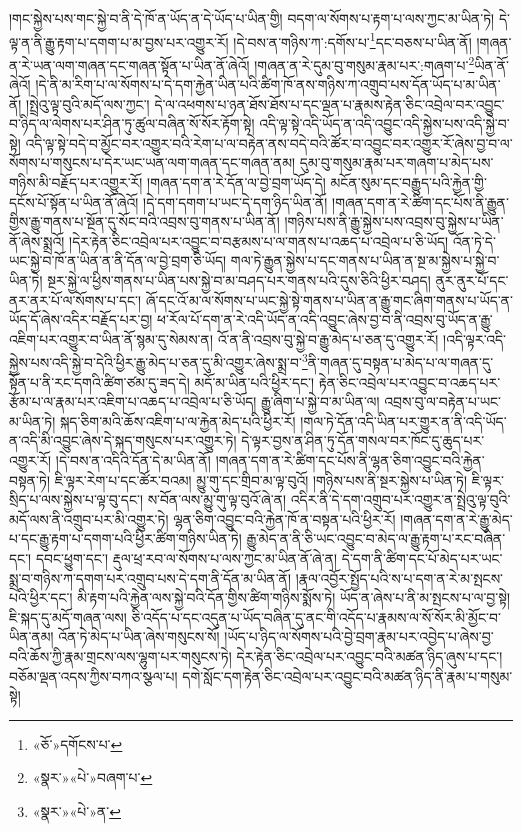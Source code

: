 །གང་སྐྱེས་པས་གང་སྐྱེ་བ་ནི་དེ་ཁོ་ན་ཡོད་ན་དེ་ཡོད་པ་ཡིན་གྱི། བདག་ལ་སོགས་པ་རྟག་པ་ལས་ཀྱང་མ་ཡིན་ཏེ། དེ་ལྟ་ན་ནི་རྒྱུ་རྟག་པ་དགག་པ་མ་བྱས་པར་འགྱུར་རོ། །དེ་བས་ན་གཉིས་ཀ་:དགོས་པ་\footnote{«ཅོ་»དགོངས་པ་}དང་བཅས་པ་ཡིན་ནོ། །གཞན་ན་རེ་ཡན་ལག་གཞན་དང་གཞན་སྟོན་པ་ཡིན་ནོ་ཞེའོ། །གཞན་ན་རེ་དུམ་བུ་གསུམ་རྣམ་པར་:གཞག་པ་\footnote{«སྣར་»«པེ་»བཞག་པ་}ཡིན་ནོ་ཞེའོ། །དེ་ནི་མ་རིག་པ་ལ་སོགས་པ་དེ་དག་རྐྱེན་ཡིན་པའི་ཚིག་ཁོ་ནས་གཉིས་ཀ་འགྲུབ་པས་དོན་ཡོད་པ་མ་ཡིན་ནོ། །སྤྲེའུ་ལྟ་བུའི་མདོ་ལས་ཀྱང་། དེ་ལ་འཕགས་པ་ཉན་ཐོས་ཐོས་པ་དང་ལྡན་པ་རྣམས་རྟེན་ཅིང་འབྲེལ་བར་འབྱུང་བ་ཉིད་ལ་ལེགས་པར་ཤིན་ཏུ་ཚུལ་བཞིན་སོ་སོར་རྟོག་སྟེ། འདི་ལྟ་སྟེ་འདི་ཡོད་ན་འདི་འབྱུང་འདི་སྐྱེས་པས་འདི་སྐྱེ་བ་སྟེ། འདི་ལྟ་སྟེ་བདེ་བ་མྱོང་བར་འགྱུར་བའི་རེག་པ་ལ་བརྟེན་ནས་བདེ་བའི་ཚོར་བ་འབྱུང་བར་འགྱུར་རོ་ཞེས་བྱ་བ་ལ་སོགས་པ་གསུངས་པ་དེར་ཡང་ཡན་ལག་གཞན་དང་གཞན་ནམ། དུམ་བུ་གསུམ་རྣམ་པར་གཞག་པ་མེད་པས་གཉིས་མི་བརྗོད་པར་འགྱུར་རོ། །གཞན་དག་ན་རེ་དོན་ལ་བྱེ་བྲག་ཡོད་དེ། མངོན་སུམ་དང་བརྒྱུད་པའི་རྐྱེན་གྱི་དངོས་པོ་སྟོན་པ་ཡིན་ནོ་ཞེའོ། །དེ་དག་དགག་པ་ཡང་དེ་དག་ཉིད་ཡིན་ནོ། །གཞན་དག་ན་རེ་ཚིག་དང་པོས་ནི་རྒྱུན་གྱིས་རྒྱུ་གནས་པ་སྔོན་དུ་སོང་བའི་འབྲས་བུ་གནས་པ་ཡིན་ནོ། །གཉིས་པས་ནི་རྒྱུ་སྐྱེས་པས་འབྲས་བུ་སྐྱེས་པ་ཡིན་ནོ་ཞེས་སྨྲའོ། །དེར་རྟེན་ཅིང་འབྲེལ་པར་འབྱུང་བ་བརྩམས་པ་ལ་གནས་པ་འཆད་པ་འབྲེལ་པ་ཅི་ཡོད། འོན་ཏེ་དེ་ཡང་སྐྱེ་བ་ཁོ་ན་ཡིན་ན་ནི་དོན་ལ་བྱེ་བྲག་ཅི་ཡོད། གལ་ཏེ་རྒྱུན་སྐྱེས་པ་དང་གནས་པ་ཡིན་ན་སྔ་མ་སྐྱེས་པ་སྐྱེ་བ་ཡིན་ཏེ། སྔར་སྐྱེ་ལ་ཕྱིས་གནས་པ་ཡིན་པས་སྐྱེ་བ་མ་བཤད་པར་གནས་པའི་དུས་ཅིའི་ཕྱིར་བཤད། ནུར་ནུར་པོ་དང་ནར་ནར་པོ་ལ་སོགས་པ་དང་། ཞོ་དང་འོ་མ་ལ་སོགས་པ་ཡང་སྐྱེ་སྟེ་གནས་པ་ཡིན་ན་རྒྱུ་གང་ཞིག་གནས་པ་ཡོད་ན་ཡོད་དོ་ཞེས་འདིར་བརྗོད་པར་བྱ། ཕ་རོལ་པོ་དག་ན་རེ་འདི་ཡོད་ན་འདི་འབྱུང་ཞེས་བྱ་བ་ནི་འབྲས་བུ་ཡོད་ན་རྒྱུ་འཇིག་པར་འགྱུར་བ་ཡིན་ནོ་སྙམ་དུ་སེམས་ན། འོ་ན་ནི་འབྲས་བུ་སྐྱེ་བ་རྒྱུ་མེད་པ་ཅན་དུ་འགྱུར་རོ། །འདི་ལྟར་འདི་སྐྱེས་པས་འདི་སྐྱེ་བ་དེའི་ཕྱིར་རྒྱུ་མེད་པ་ཅན་དུ་མི་འགྱུར་ཞེས་སྨྲ་བ་\footnote{«སྣར་»«པེ་»ན་}ནི་གཞན་དུ་བསྟན་པ་མེད་པ་ལ་གཞན་དུ་སྟོན་པ་ནི་རང་དགའི་ཚིག་ཙམ་དུ་ཟད་དེ། མདོ་མ་ཡིན་པའི་ཕྱིར་དང་། རྟེན་ཅིང་འབྲེལ་པར་འབྱུང་བ་འཆད་པར་རྩོམ་པ་ལ་རྣམ་པར་འཇིག་པ་འཆད་པ་འབྲེལ་པ་ཅི་ཡོད། རྒྱུ་ཞིག་པ་སྐྱེ་བ་མ་ཡིན་ལ། འབྲས་བུ་ལ་བརྟེན་པ་ཡང་མ་ཡིན་ཏེ། སྐད་ཅིག་མའི་ཆོས་འཇིག་པ་ལ་རྐྱེན་མེད་པའི་ཕྱིར་རོ། །གལ་ཏེ་དོན་འདི་ཡིན་པར་གྱུར་ན་ནི་འདི་ཡོད་ན་འདི་མི་འབྱུང་ཞེས་དེ་སྐད་གསུངས་པར་འགྱུར་ཏེ། དེ་ལྟར་བྱས་ན་ཤིན་ཏུ་དོན་གསལ་བར་ཁོང་དུ་ཆུད་པར་འགྱུར་རོ། །དེ་བས་ན་འདིའི་དོན་དེ་མ་ཡིན་ནོ། །གཞན་དག་ན་རེ་ཚིག་དང་པོས་ནི་ལྷན་ཅིག་འབྱུང་བའི་རྐྱེན་བསྟན་ཏེ། ཇི་ལྟར་རེག་པ་དང་ཚོར་བའམ། མྱུ་གུ་དང་གྲིབ་མ་ལྟ་བུའོ། །གཉིས་པས་ནི་སྔར་སྐྱེས་པ་ཡིན་ཏེ། ཇི་ལྟར་སྲིད་པ་ལས་སྐྱེས་པ་ལྟ་བུ་དང་། ས་བོན་ལས་མྱུ་གུ་ལྟ་བུའོ་ཞེ་ན། འདིར་ནི་དེ་དག་འགྲུབ་པར་འགྱུར་ན་སྤྲེའུ་ལྟ་བུའི་མདོ་ལས་ནི་འགྲུབ་པར་མི་འགྱུར་ཏེ། ལྷན་ཅིག་འབྱུང་བའི་རྐྱེན་ཁོ་ན་བསྟན་པའི་ཕྱིར་རོ། །གཞན་དག་ན་རེ་རྒྱུ་མེད་པ་དང་རྒྱུ་རྟག་པ་དགག་པའི་ཕྱིར་ཚིག་གཉིས་ཡིན་ཏེ། རྒྱུ་མེད་ན་ནི་ཅི་ཡང་འབྱུང་བ་མེད་ལ་རྒྱུ་རྟག་པ་རང་བཞིན་དང་། དབང་ཕྱུག་དང་། རྡུལ་ཕྲ་རབ་ལ་སོགས་པ་ལས་ཀྱང་མ་ཡིན་ནོ་ཞེ་ན། དེ་དག་ནི་ཚིག་དང་པོ་མེད་པར་ཡང་སྨྲ་བ་གཉིས་ཀ་དགག་པར་འགྲུབ་པས་དེ་དག་ནི་དོན་མ་ཡིན་ནོ། །རྣལ་འབྱོར་སྤྱོད་པའི་ས་པ་དག་ན་རེ་མ་སྤངས་པའི་ཕྱིར་དང་། མི་རྟག་པའི་རྐྱེན་ལས་སྐྱེ་བའི་དོན་གྱིས་ཚིག་གཉིས་སྨོས་ཏེ། ཡོད་ན་ཞེས་པ་ནི་མ་སྤངས་པ་ལ་བྱ་སྟེ། ཇི་སྐད་དུ་མདོ་གཞན་ལས། ཅི་འདོད་པ་དང་འདུན་པ་ཡོད་བཞིན་དུ་ནང་གི་འདོད་པ་རྣམས་ལ་སོ་སོར་མི་མྱོང་བ་ཡིན་ནམ། འོན་ཏེ་མེད་པ་ཡིན་ཞེས་གསུངས་སོ། །ཡོད་པ་ཉིད་ལ་སོགས་པའི་བྱེ་བྲག་རྣམ་པར་འབྱེད་པ་ཞེས་བྱ་བའི་ཆོས་ཀྱི་རྣམ་གྲངས་ལས་ལྷུག་པར་གསུངས་ཏེ། དེར་རྟེན་ཅིང་འབྲེལ་པར་འབྱུང་བའི་མཚན་ཉིད་ཞུས་པ་དང་། བཅོམ་ལྡན་འདས་ཀྱིས་བཀའ་སྩལ་པ། དགེ་སློང་དག་རྟེན་ཅིང་འབྲེལ་པར་འབྱུང་བའི་མཚན་ཉིད་ནི་རྣམ་པ་གསུམ་སྟེ། 